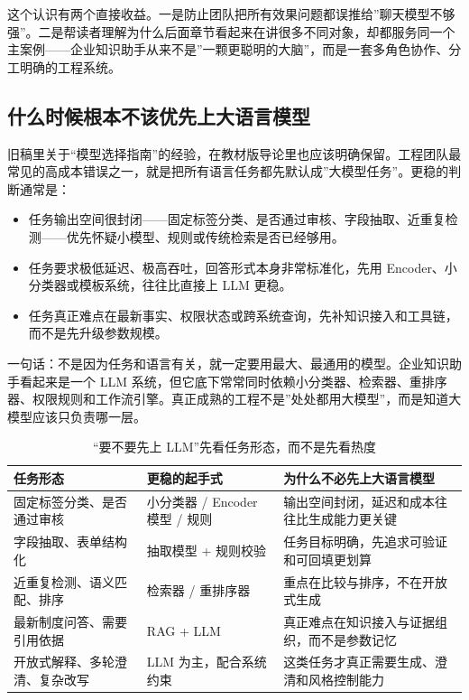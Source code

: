 这个认识有两个直接收益。一是防止团队把所有效果问题都误推给”聊天模型不够强”。二是帮读者理解为什么后面章节看起来在讲很多不同对象，却都服务同一个主案例——企业知识助手从来不是”一颗更聪明的大脑”，而是一套多角色协作、分工明确的工程系统。

\subsection{什么时候根本不该优先上大语言模型}
旧稿里关于“模型选择指南”的经验，在教材版导论里也应该明确保留。工程团队最常见的高成本错误之一，就是把所有语言任务都先默认成”大模型任务”。更稳的判断通常是：
\begin{itemize}
  \item 任务输出空间很封闭——固定标签分类、是否通过审核、字段抽取、近重复检测——优先怀疑小模型、规则或传统检索是否已经够用。
  \item 任务要求极低延迟、极高吞吐，回答形式本身非常标准化，先用 Encoder、小分类器或模板系统，往往比直接上 LLM 更稳。
  \item 任务真正难点在最新事实、权限状态或跨系统查询，先补知识接入和工具链，而不是先升级参数规模。
\end{itemize}

一句话：不是因为任务和语言有关，就一定要用最大、最通用的模型。企业知识助手看起来是一个 LLM 系统，但它底下常常同时依赖小分类器、检索器、重排序器、权限规则和工作流引擎。真正成熟的工程不是”处处都用大模型”，而是知道大模型应该只负责哪一层。

\begin{table}[H]
\centering
\small
\begin{tabularx}{\textwidth}{>{\raggedright\arraybackslash}p{3cm}>{\raggedright\arraybackslash}p{3cm}>{\raggedright\arraybackslash}X}
\toprule
\textbf{任务形态} & \textbf{更稳的起手式} & \textbf{为什么不必先上大语言模型} \\
\midrule
固定标签分类、是否通过审核 & 小分类器 / Encoder 模型 / 规则 & 输出空间封闭，延迟和成本往往比生成能力更关键 \\
字段抽取、表单结构化 & 抽取模型 + 规则校验 & 任务目标明确，先追求可验证和可回填更划算 \\
近重复检测、语义匹配、排序 & 检索器 / 重排序器 & 重点在比较与排序，不在开放式生成 \\
最新制度问答、需要引用依据 & RAG + LLM & 真正难点在知识接入与证据组织，而不是参数记忆 \\
开放式解释、多轮澄清、复杂改写 & LLM 为主，配合系统约束 & 这类任务才真正需要生成、澄清和风格控制能力 \\
\bottomrule
\end{tabularx}
\caption{“要不要先上 LLM”先看任务形态，而不是先看热度}
\label{tab:first-choice-routing}
\end{table}

